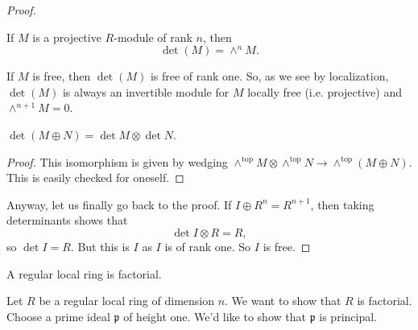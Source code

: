 \begin{proof}
\begin{definition} 
If $M$ is a projective $R$-module of rank $n$, then 
\[ \det(M) = \wedge^n M.  \]
\end{definition} 
If $M$ is free, then $\det(M)$ is free of rank one. So, as we see by
localization, $\det(M)$ is always an
invertible module for $M$ locally free (i.e. projective) and $\wedge^{n+1}M = 0$.

\begin{lemma} 
$\det(M \oplus N) = \det M \otimes \det N$.
\end{lemma} 
\begin{proof} 
This isomorphism is given by wedging $\wedge^{\mathrm{top}} M \otimes
\wedge^{\mathrm{top}} N \to \wedge^{\mathrm{top}}(M \oplus N)$. This is easily
checked for oneself.
\end{proof} 

Anyway, let us finally go back to the proof. If $I \oplus R^n = R^{n+1}$, then
taking determinants shows that
\[ \det I \otimes R = R,  \]
so $\det I = R$. But this is $I$ as $I$ is of rank one. So $I$ is free.

\end{proof} 

\begin{theorem} 
A regular local ring is factorial.
\end{theorem} 

Let $R$ be a regular local ring of dimension $n$. We want to show that $R$ is factorial. 
Choose a prime ideal $\mathfrak{p}$ of height one. 
We'd like to show that $\mathfrak{p}$ is principal. 

